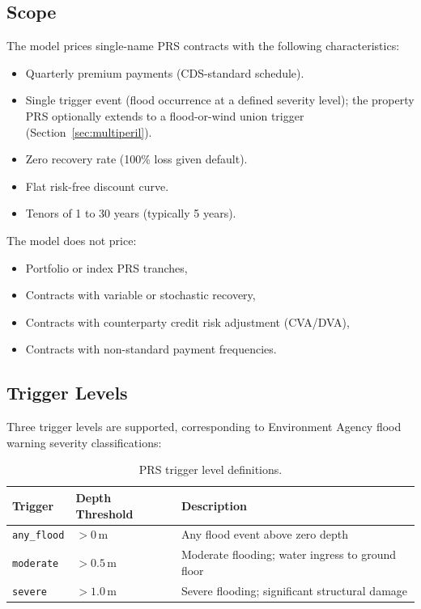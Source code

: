 \documentclass[11pt,a4paper]{article}
\begin{document}
\subsection{Scope}

The model prices single-name PRS contracts with the following characteristics:

\begin{itemize}[nosep]
    \item Quarterly premium payments (CDS-standard schedule).
    \item Single trigger event (flood occurrence at a defined severity level); the
          property PRS optionally extends to a flood-or-wind union trigger
          (Section~\ref{sec:multiperil}).
    \item Zero recovery rate (100\% loss given default).
    \item Flat risk-free discount curve.
    \item Tenors of 1 to 30 years (typically 5 years).
\end{itemize}

The model does not price:
\begin{itemize}[nosep]
    \item Portfolio or index PRS tranches,
    \item Contracts with variable or stochastic recovery,
    \item Contracts with counterparty credit risk adjustment (CVA/DVA),
    \item Contracts with non-standard payment frequencies.
\end{itemize}

\subsection{Trigger Levels}

Three trigger levels are supported, corresponding to Environment Agency flood warning
severity classifications:

\begin{table}[H]
    \centering
    \begin{tabular}{llp{7cm}}
        \toprule
        \textbf{Trigger} & \textbf{Depth Threshold} & \textbf{Description} \\
        \midrule
        \texttt{any\_flood} & $>0$\,m   & Any flood event above zero depth \\
        \texttt{moderate}   & $>0.5$\,m & Moderate flooding; water ingress to ground floor \\
        \texttt{severe}     & $>1.0$\,m & Severe flooding; significant structural damage \\
        \bottomrule
    \end{tabular}
    \caption{PRS trigger level definitions.}
    \label{tab:trigger_levels}
\end{table}
\end{document}
